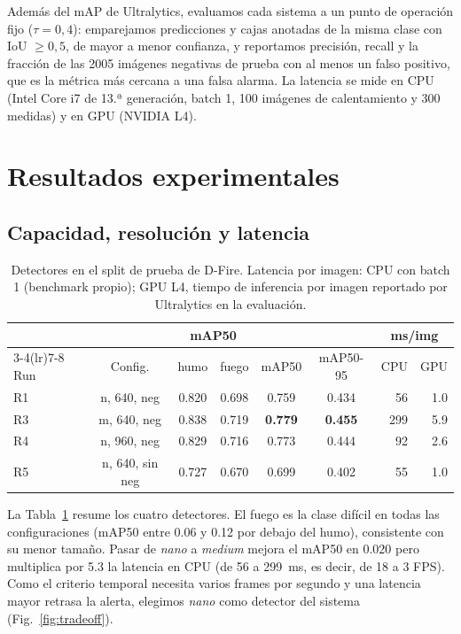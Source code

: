 \documentclass[conference,a4paper]{IEEEtran}
\begin{document}
Además del mAP de Ultralytics, evaluamos cada sistema a un punto de operación fijo ($\tau=0{,}4$): emparejamos predicciones y cajas anotadas de la misma clase con IoU $\ge 0{,}5$, de mayor a menor confianza, y reportamos precisión, recall y la fracción de las \num{2005} imágenes negativas de prueba con al menos un falso positivo, que es la métrica más cercana a una falsa alarma. La latencia se mide en CPU (Intel Core i7 de 13.ª generación, batch 1, 100 imágenes de calentamiento y 300 medidas) y en GPU (NVIDIA L4).

\section{Resultados experimentales}

\subsection{Capacidad, resolución y latencia}

\begin{table}[t]
\centering
\caption{Detectores en el split de prueba de D-Fire. Latencia por imagen: CPU con batch 1 (benchmark propio); GPU L4, tiempo de inferencia por imagen reportado por Ultralytics en la evaluación.}
\label{tab:runs}
\setlength{\tabcolsep}{3.2pt}
\begin{tabular}{@{}lcccccrr@{}}
\toprule
 & & \multicolumn{2}{c}{mAP50} & & & \multicolumn{2}{c}{ms/img} \\
\cmidrule(lr){3-4}\cmidrule(lr){7-8}
Run & Config. & humo & fuego & mAP50 & mAP50-95 & CPU & GPU \\
\midrule
R1 & n, 640, neg   & \num{0.820} & \num{0.698} & \num{0.759} & \num{0.434} & \num{56}  & \num{1.0} \\
R3 & m, 640, neg   & \num{0.838} & \num{0.719} & \textbf{\num{0.779}} & \textbf{\num{0.455}} & \num{299} & \num{5.9} \\
R4 & n, 960, neg   & \num{0.829} & \num{0.716} & \num{0.773} & \num{0.444} & \num{92}  & \num{2.6} \\
R5 & n, 640, sin neg & \num{0.727} & \num{0.670} & \num{0.699} & \num{0.402} & \num{55}  & \num{1.0} \\
\bottomrule
\end{tabular}
\end{table}

La Tabla~\ref{tab:runs} resume los cuatro detectores. El fuego es la clase difícil en todas las configuraciones (mAP50 entre \num{0.06} y \num{0.12} por debajo del humo), consistente con su menor tamaño. Pasar de \textit{nano} a \textit{medium} mejora el mAP50 en \num{0.020} pero multiplica por \num{5.3} la latencia en CPU (de \SI{56}{} a \SI{299}{ms}, es decir, de 18 a 3 FPS). Como el criterio temporal necesita varios frames por segundo y una latencia mayor retrasa la alerta, elegimos \textit{nano} como detector del sistema (Fig.~\ref{fig:tradeoff}).
\end{document}
